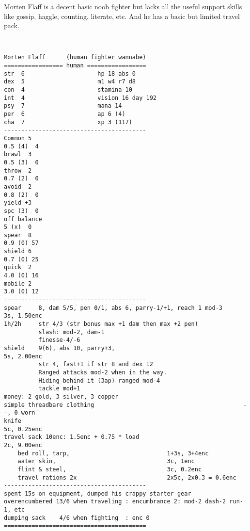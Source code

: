 \clearpage
\begin{samepage}

\noindent Morten Flaff is a decent basic noob fighter but lacks all the useful support skills like gossip, haggle, counting, literate, etc. And he has a basic but limited travel pack.

\

\small \begin{verbatim}
Morten Flaff      (human fighter wannabe)
================= human =================
str  6                     hp 18 abs 0
dex  5                     m1 w4 r7 d8
con  4                     stamina 10
int  4                     vision 16 day 192
psy  7                     mana 14
per  6                     ap 6 (4)
cha  7                     xp 3 (117)
-----------------------------------------
Common 5                                                              0.5 (4)  4
brawl  3                                                              0.5 (3)  0
throw  2                                                              0.7 (2)  0
avoid  2                                                              0.8 (2)  0
yield +3                                                              spc (3)  0
off balance                                                             5 (x)  0
spear  8                                                              0.9 (0) 57
shield 6                                                              0.7 (0) 25
quick  2                                                              4.0 (0) 16
mobile 2                                                              3.0 (0) 12
-----------------------------------------
spear     8, dam 5/5, pen 0/1, abs 6, parry-1/+1, reach 1 mod-3      3s, 1.50enc
1h/2h     str 4/3 (str bonus max +1 dam then max +2 pen)
          slash: mod-2, dam-1
          finesse-4/-6
shield    9(6), abs 10, parry+3,                                     5s, 2.00enc
          str 4, fast+1 if str 8 and dex 12
          Ranged attacks mod-2 when in the way.
          Hiding behind it (3ap) ranged mod-4
          tackle mod+1
money: 2 gold, 3 silver, 3 copper
simple threadbare clothing                                           --, 0 worn
knife                                                                5c, 0.25enc
travel sack 10enc: 1.5enc + 0.75 * load                              2c, 9.00enc
    bed roll, tarp,                            1+3s, 3+4enc
    water skin,                                3c, 1enc
    flint & steel,                             3c, 0.2enc
    travel rations 2x                          2x5c, 2x0.3 = 0.6enc
-----------------------------------------
spent 15s on equipment, dumped his crappy starter gear
overencumbered 13/6 when traveling : encumbrance 2: mod-2 dash-2 run-1, etc
dumping sack    4/6 when fighting  : enc 0
=========================================
\end{verbatim} \end{samepage} \normalsize





